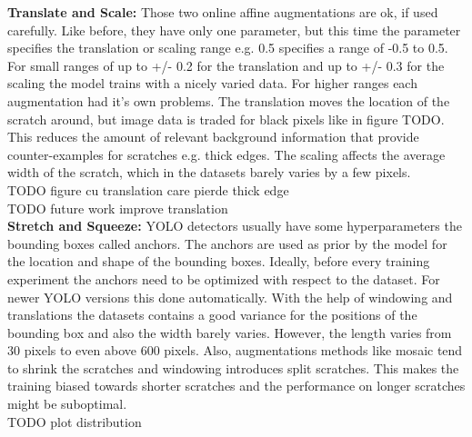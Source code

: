 \textbf{Translate and Scale: }
Those two online affine augmentations are ok, if used carefully. Like before, they have only one parameter, but this time the parameter specifies the translation or scaling range e.g. 0.5 specifies a range of -0.5 to 0.5. For small ranges of up to +/- 0.2 for the translation and up to +/- 0.3 for the scaling the model trains with a nicely varied data. For higher ranges each augmentation had it's own problems. The translation moves the location of the scratch around, but image data is traded for black pixels like in figure TODO. This reduces the amount of relevant background information that provide counter-examples for scratches e.g. thick edges. The scaling affects the average width of the scratch, which in the datasets barely varies by a few pixels. \\

TODO figure cu translation care pierde thick edge \\

TODO future work improve translation \\


\textbf{Stretch and Squeeze:}
YOLO detectors usually have some hyperparameters the bounding boxes called anchors. The anchors are used as prior by the model for the location and shape of the bounding boxes. Ideally, before every training experiment the anchors need to be optimized with respect to the dataset. For newer YOLO versions this done automatically. With the help of windowing and translations the datasets contains a good variance for the positions of the bounding box and also the width barely varies. However, the length varies from 30 pixels to even above 600 pixels. Also, augmentations methods like mosaic tend to shrink the scratches and windowing introduces split scratches. This makes the training biased towards shorter scratches and the performance on longer scratches might be suboptimal. \\

TODO plot distribution \\

